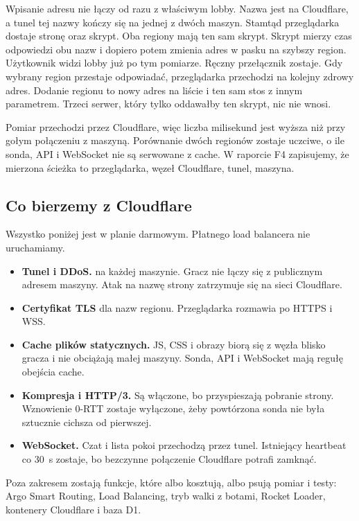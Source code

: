 Wpisanie adresu nie łączy od razu z właściwym lobby. Nazwa jest na Cloudflare,
a tunel tej nazwy kończy się na jednej z dwóch maszyn. Stamtąd przeglądarka
dostaje stronę oraz skrypt. Oba regiony mają ten sam skrypt. Skrypt mierzy czas
odpowiedzi obu nazw i dopiero potem zmienia adres w pasku na szybszy region.
Użytkownik widzi lobby już po tym pomiarze. Ręczny przełącznik zostaje. Gdy
wybrany region przestaje odpowiadać, przeglądarka przechodzi na kolejny zdrowy
adres. Dodanie regionu to nowy adres na liście i ten sam stos z innym parametrem.
Trzeci serwer, który tylko oddawałby ten skrypt, nic nie wnosi.

Pomiar przechodzi przez Cloudflare, więc liczba milisekund jest wyższa niż przy
gołym połączeniu z maszyną. Porównanie dwóch regionów zostaje uczciwe, o ile
sonda, API i WebSocket nie są serwowane z cache. W raporcie F4 zapisujemy, że
mierzona ścieżka to przeglądarka, węzeł Cloudflare, tunel, maszyna.

\subsection{Co bierzemy z Cloudflare}
Wszystko poniżej jest w planie darmowym. Płatnego load balancera nie uruchamiamy.
\begin{itemize}
  \item \textbf{Tunel i DDoS.}  na każdej maszynie. Gracz nie
        łączy się z publicznym adresem maszyny. Atak na nazwę strony zatrzymuje
        się na sieci Cloudflare.
  \item \textbf{Certyfikat TLS} dla nazw regionu. Przeglądarka rozmawia po HTTPS i WSS.
  \item \textbf{Cache plików statycznych.} JS, CSS i obrazy biorą się z węzła
        blisko gracza i nie obciążają małej maszyny. Sonda, API i WebSocket
        mają regułę obejścia cache.
  \item \textbf{Kompresja i HTTP/3.} Są włączone, bo przyspieszają pobranie strony.
        Wznowienie 0-RTT zostaje wyłączone, żeby powtórzona sonda nie była
        sztucznie cichsza od pierwszej.
  \item \textbf{WebSocket.} Czat i lista pokoi przechodzą przez tunel. Istniejący
        heartbeat co 30~s zostaje, bo bezczynne połączenie Cloudflare potrafi zamknąć.
\end{itemize}
Poza zakresem zostają funkcje, które albo kosztują, albo psują pomiar i testy:
Argo Smart Routing, Load Balancing, tryb walki z botami, Rocket Loader,
kontenery Cloudflare i baza D1.

